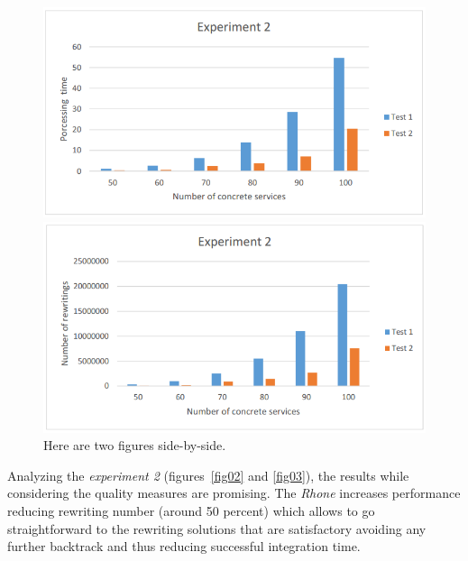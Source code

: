 

\begin{figure}%
\centering
\parbox{2.2in}{\includegraphics[scale=0.30]{exp2.png}}%
\qquad
\begin{minipage}{2in}%
\includegraphics[scale=0.30]{exp3.png}
\end{minipage}%
\caption{Here are two figures side-by-side.}%
\label{fig:1figs}%
\end{figure}

Analyzing the \textit{experiment 2} (figures~\ref{fig02} and \ref{fig03}), the results while considering the quality measures are promising.  
The \textit{Rhone} increases performance reducing rewriting number (around 50 percent) which allows to go straightforward to the rewriting solutions that are satisfactory avoiding any further backtrack and thus reducing successful integration time.
